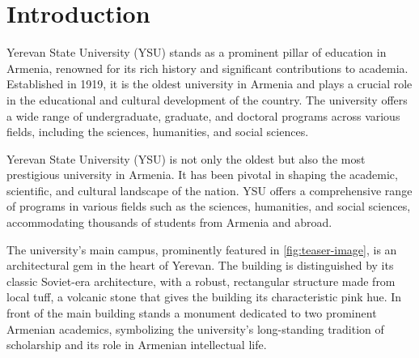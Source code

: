 \documentclass[12pt,onecolumn]{article}
\begin{document}
\newcommand{\authorFullNameArm}{Պողոս Պետրոսյան Պետրոսի}
\newcommand{\authorNameEng}{Poghos Petrosyan}
\newcommand{\authorNameArm}{Պողոս Պետրոսյան}
\newcommand{\supervisorNameArm}{ֆ.մ.գ.դ., Ջեֆրի Հինթոն}
\newcommand{\programCoordinatorName}{ֆ.մ.գ.դ., ասիստենտ Կարեն Քեռյան}

\newcommand{\thesisTitleArm}{ԵՊՀ-ի դերը Հայաստանի կրթական և տնտեսական լանդշաֆտի ձևավորման գործում}
\newcommand{\thesisTitleEng}{YSU's Role in Shaping Armenia's Educational and Economic Landscape}
\newcommand{\thesisTitleRus}{Роль ЕГУ в формировании образовательного и экономического ландшафта Армении}







\setmainfont{Times New Roman}
\fontsize{12pt}{12pt}\selectfont


\tableofcontents
\clearpage


\section{Introduction}

Yerevan State University (YSU) stands as a prominent pillar of education in Armenia, renowned for its rich history and significant contributions to academia. Established in 1919, it is the oldest university in Armenia and plays a crucial role in the educational and cultural development of the country. The university offers a wide range of undergraduate, graduate, and doctoral programs across various fields, including the sciences, humanities, and social sciences.

Yerevan State University (YSU) is not only the oldest but also the most prestigious university in Armenia. It has been pivotal in shaping the academic, scientific, and cultural landscape of the nation. YSU offers a comprehensive range of programs in various fields such as the sciences, humanities, and social sciences, accommodating thousands of students from Armenia and abroad.

The university’s main campus, prominently featured in \cref{fig:teaser-image}, is an architectural gem in the heart of Yerevan. The building is distinguished by its classic Soviet-era architecture, with a robust, rectangular structure made from local tuff, a volcanic stone that gives the building its characteristic pink hue. In front of the main building stands a monument dedicated to two prominent Armenian academics, symbolizing the university's long-standing tradition of scholarship and its role in Armenian intellectual life.
\end{document}

